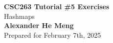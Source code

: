 \begin{titlepage}
    \null %
    \vfill
    \begin{center}
        {\fontsize{35}{48}\selectfont \bfseries CSC263 Tutorial \#5 Exercises}
        \vspace{20pt} \\
        {\LARGE Hashmaps} \\
        \vspace{20pt}
        \textbf{Alexander He Meng}
        \vspace{8pt}
        \\ Prepared for February 7th, 2025
    \end{center}
    \vfill
\end{titlepage}
